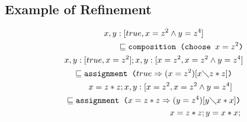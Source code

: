\documentclass[landscape]{cheat}
\begin{document}
\begin{multicols*}{3}
\subsection{Example of Refinement}
\nonumber
\begin{gather}
\nonumber
    \begin{split}
        x, y: [true, x = z^2 \land y = z^4]
    \end{split} \\
\nonumber
    \begin{split}
        \sqsubseteq \texttt{composition (choose } x = z^2\texttt{)} \\
        x, y: [true, x = z^2]; x, y: [x = z^2, x = z^2 \land y = z^4] \\
    \end{split} \\
\nonumber
    \begin{split}
        \sqsubseteq \texttt{assignment (}true \Rightarrow (x = z^2)[x \diagdown z * z]\texttt{)} \\
        x = z * z; x, y: [x = z^2, x = z^2 \land y = z^4] \\
    \end{split} \\
\nonumber
    \begin{split}
        \sqsubseteq \texttt{assignment (}x = z * z \Rightarrow (y = z^4)[y \diagdown x * x]\texttt{)} \\
        x = z * z; y = x * x;
    \end{split} \\
\end{gather}

\end{multicols*}
\end{document}
